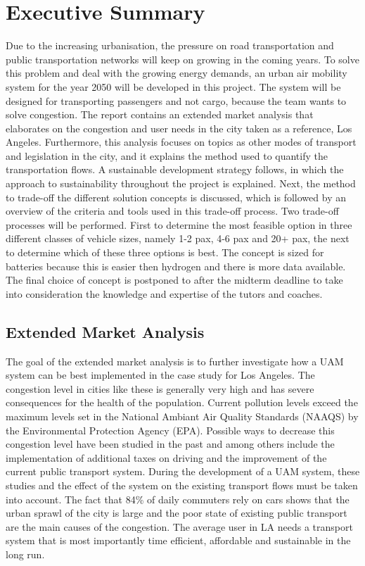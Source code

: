 \newpage
\chapter{Executive Summary}
\label{ch-ES}

Due to the increasing urbanisation, the pressure on road transportation and public transportation networks will keep on growing in the coming years. To solve this problem and deal with the growing energy demands, an urban air mobility system for the year 2050 will be developed in this project. The system will be designed for transporting passengers and not cargo, because the team wants to solve congestion. The report contains an extended market analysis that elaborates on the congestion and user needs in the city taken as a reference, Los Angeles. Furthermore, this analysis focuses on topics as other modes of transport and legislation in the city, and it explains the method used to quantify the transportation flows. A sustainable development strategy follows, in which the approach to sustainability throughout the project is explained. Next, the method to trade-off the different solution concepts is discussed, which is followed by an overview of the criteria and tools used in this trade-off process. Two trade-off processes will be performed. First to determine the most feasible option in three different classes of vehicle sizes, namely 1-2 pax, 4-6 pax and 20+ pax, the next to determine which of these three options is best. The concept is sized for batteries because this is easier then hydrogen and there is more data available. The final choice of concept is postponed to after the midterm deadline to take into consideration the knowledge and expertise of the tutors and coaches. 

\section{Extended Market Analysis}
The goal of the extended market analysis is to further investigate how a UAM system can be best implemented in the case study for Los Angeles. The congestion level in cities like these is generally very high and has severe consequences for the health of the population. Current pollution levels exceed the maximum levels set in the National Ambiant Air Quality Standards (NAAQS) by the Environmental Protection Agency (EPA). Possible ways to decrease this congestion level have been studied in the past and among others include the implementation of additional taxes on driving and the improvement of the current public transport system. During the development of a UAM system, these studies and the effect of the system on the existing transport flows must be taken into account. The fact that 84\% of daily commuters rely on cars shows that the urban sprawl of the city is large and the poor state of existing public transport are the main causes of the congestion. The average user in LA needs a transport system that is most importantly time efficient, affordable and sustainable in the long run. 

